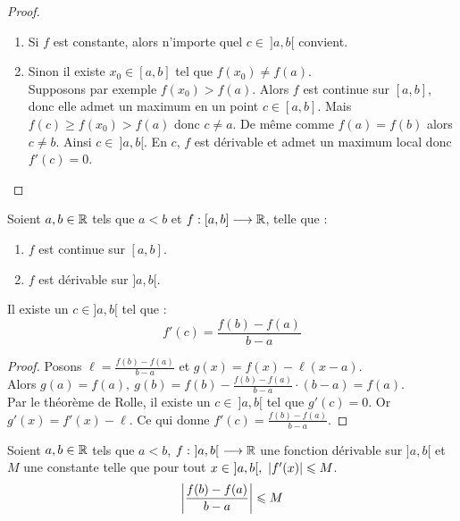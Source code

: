 \begin{proof}\cite{exo7_analyse1}
	\leavevmode
	\begin{enumerate}
		\item Si $f$ est constante, alors n'importe quel $c \in \ ]a, b[$ convient.
		\item Sinon il existe $x_0 \in [a, b]$ tel que $f(x_0) \neq f(a)$. 
		\\
		Supposons par exemple $f(x_0) > f(a)$. Alors $f$ est continue sur $[a, b]$, donc elle admet un maximum en un point $c \in [a, b]$. Mais $f(c) \geq f(x_0) > f(a)$ donc $c \neq a$. De même comme $f(a) = f(b)$ alors $c \neq b$. Ainsi $c \in \ ]a, b[$. En $c$, $f$ est dérivable et admet un maximum local donc $f'(c) = 0$.
	\end{enumerate}
\end{proof}

\begin{theorem}
    Soient $a, b \in \mathbb{R}$ tels que $a < b$ et $f : [a, b] \longrightarrow \mathbb{R}$, telle que : 
    \begin{enumerate}
            \item $f$ est continue sur $[a, b]$.
            \item $f$ est dérivable sur $]a, b[$.
        \end{enumerate}
    \par \noindent Il existe un $c \in ]a, b[$ tel que :
	\[ f'(c) = \frac{f(b) - f(a)}{b - a} \]
\end{theorem}

\begin{proof}\cite{exo7_analyse1}
	Posons $\ell = \frac{f(b) - f(a)}{b - a}$ et $g(x) = f(x) - \ell (x - a)$.
	 \\
	 Alors $g(a) = f(a),\ g(b) = f(b) - \frac{f(b) - f(a)}{b - a} \cdot (b - a) = f(a)$.
	 \\
	  Par le théorème de Rolle, il existe un $c \in \ ]a, b[$ tel que $g'(c) = 0$. Or $g'(x) = f'(x) - \ell$. Ce qui donne $f'(c) = \frac{f(b) - f(a)}{b - a}$.
\end{proof}

\begin{corollary}
	Soient $a,b \in \mathbb{R}$ tels que $a < b$, $f : \ ]a, b[ \ \longrightarrow \mathbb{R}$ une fonction dérivable sur $]a, b[$ et $M$ une constante telle que pour tout $x \in \ ]a, b[,\ \abs{f'(x)} \leqslant M$.
	\[ \abs{\frac{f(b) - f(a)}{b - a}} \leqslant M \]
\end{corollary}

